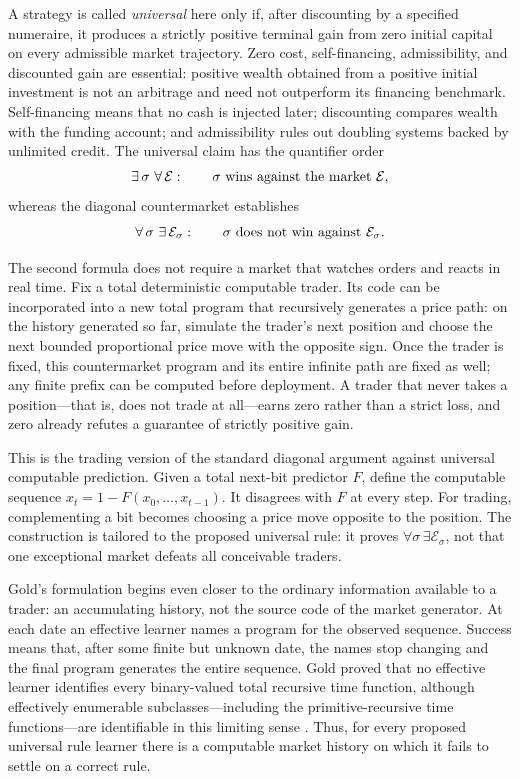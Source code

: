 \documentclass[aps,pra,reprint,superscriptaddress,amsmath,amssymb,floatfix]{revtex4-2}
\theoremstyle{plain}
\theoremstyle{definition}
\theoremstyle{remark}
\begin{document}
A strategy is called \emph{universal} here only if, after discounting by a
specified numeraire, it produces a strictly positive terminal gain from zero
initial capital on every admissible market trajectory. Zero cost,
self-financing, admissibility, and discounted gain are essential: positive
wealth obtained from a positive initial investment is not an arbitrage and
need not outperform its financing benchmark. Self-financing means that no cash
is injected later; discounting compares wealth with the funding account; and
admissibility rules out doubling systems backed by unlimited credit. The
universal claim has the quantifier order
\begin{equation}
  \exists\,\sigma\ \forall\,\mathcal E:
  \qquad \sigma\ \hbox{wins against the market }\mathcal E ,
  \label{eq:universalquantifiers}
\end{equation}
whereas the diagonal countermarket establishes
\begin{equation}
  \forall\,\sigma\ \exists\,\mathcal E_\sigma:
  \qquad \sigma\ \hbox{does not win against }\mathcal E_\sigma .
  \label{eq:counterquantifiers}
\end{equation}

The second formula does not require a market that watches orders and reacts in
real time. Fix a total deterministic computable trader. Its code can be
incorporated into a new total program that recursively generates a price path:
on the history generated so far, simulate the trader's next position and choose
the next bounded proportional price move with the opposite sign. Once the
trader is fixed, this countermarket program and its entire infinite path are
fixed as well; any finite prefix can be computed before deployment. A trader
that never takes a position---that is, does not trade at all---earns zero
rather than a strict loss, and zero already refutes a guarantee of strictly
positive gain.

This is the trading version of the standard diagonal argument against
universal computable prediction. Given a total next-bit predictor \(F\), define
the computable sequence \(x_t=1-F(x_0,\ldots,x_{t-1})\). It disagrees with
\(F\) at every step. For trading, complementing a bit becomes choosing a price
move opposite to the position. The construction is tailored to the proposed
universal rule: it proves \(\forall\sigma\,\exists\mathcal E_\sigma\), not that
one exceptional market defeats all conceivable traders.

Gold's formulation begins even closer to the ordinary information available to
a trader: an accumulating history, not the source code of the market
generator. At each date an effective learner names a program for the observed
sequence. Success means that, after some finite but unknown date, the names stop
changing and the final program generates the entire sequence. Gold proved that
no effective learner identifies every binary-valued total recursive time
function, although effectively enumerable subclasses---including the
primitive-recursive time functions---are identifiable in this limiting sense
\cite{go-65,go-67}. Thus, for every proposed universal rule learner there is a
computable market history on which it fails to settle on a correct rule.
\end{document}
